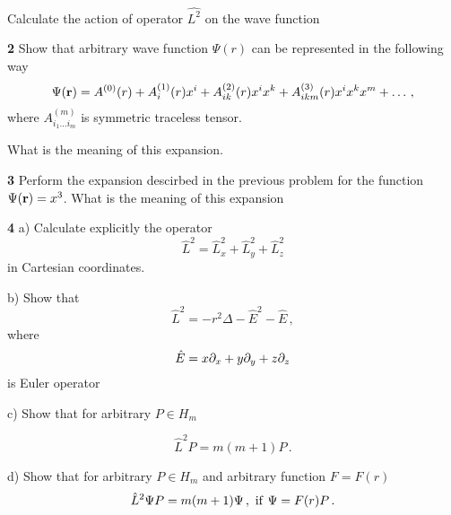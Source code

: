 Calculate the action of operator $\hat {L^2}$ on the wave function

\m
 
{\bf 2}  Show that arbitrary wave function  $\Psi(r)$ can be represented
in the following way
              $$
    \Psi({\bf r})=
   A^{(0)}(r)+
   A^{(1)}_i(r)x^i+
   A^{(2)}_{ik}(r)x^ix^k+
   A^{(3)}_{ikm}(r)x^ix^kx^m+\dots\,,
             $$       
where $A^{(m)}_{i_1\dots i_m}$ is symmetric traceless tensor.

    What is the meaning of this expansion.


\m

{\bf 3}   Perform the expansion descirbed in the previous
problem for the function 
$\Psi({\bf r})=x^3$.     What is the meaning of this expansion
  
\m



{\bf 4}   a) 
Calculate explicitly the operator
                         $$
 \hat L^2=
 \hat L^2_x+
 \hat L^2_y+
 \hat L^2_z
                         $$
in Cartesian coordinates.

b) Show that
              $$
 \hat L^2=-r^2\Delta-\hat E^2-\hat E\,,
              $$
where
            $$
\hat E=x\partial_x+y\partial_y+z\partial_z
            $$
is Euler operator

c) Show that for arbitrary $P\in H_m$

         $$
   \hat L^2 P=m(m+1) P\,.
         $$

d) Show that for arbitrary $P\in H_m$ and arbitrary function
   $F=F(r)$
         $$
   \hat L^2 \Psi P=m(m+1) \Psi\,,\,\, {\rm if}\,\, \Psi=F(r)P\,.
         $$

 
\bye       
